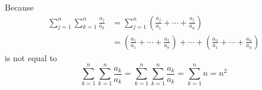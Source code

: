 \documentclass[a4paper,12pt]{article}
\makeatletter
\newtheorem*{solution}{Solution}
\theoremstyle{definition}
\renewenvironment{solution}[1][Solution] {\par\pushQED{\qed}\normalfont\topsep6\p@\@plus6\p@\relax\trivlist\item[\hskip\labelsep\bfseries#1\@addpunct{.}]\ignorespaces}{\popQED\endtrivlist\@endpefalse} \makeatother
\newenvironment{problems}{\begin{list}{}{\renewcommand{\makelabel}[1]{\textbf{##1}\hfil}}}{\end{list}}
\makeatother
\begin{document}
\begin{problems}
\begin{solution}
\begin{equation*}
        \end{equation*}
        Because
        \begin{align*}
            \sum_{j=1}^n\sum_{k=1}^n\frac{a_j}{a_k} &= \sum_{j=1}^n\left(\frac{a_j}{a_1} + \cdots + \frac{a_j}{a_n}\right)\\
            &= \left(\frac{a_1}{a_1} + \cdots + \frac{a_1}{a_n}\right) + \cdots + \left(\frac{a_n}{a_1} + \cdots + \frac{a_n}{a_n}\right) 
        \end{align*}
        is not equal to
        \begin{equation*}
            \sum_{k=1}^n\sum_{k=1}^n \frac{a_k}{a_k} = \sum_{k=1}^n\sum_{k=1}^n \frac{a_k}{a_k} = \sum_{k=1}^n n = n^2
        \end{equation*}

    \end{solution}
\end{problems}
\end{document}
